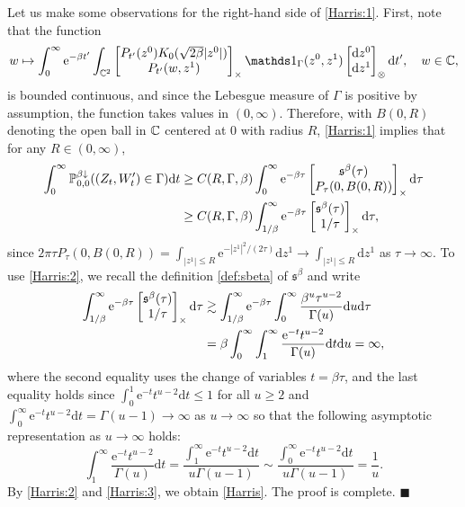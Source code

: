 \documentclass[12pt, twoside]{article}
\numberwithin{figure}{section}
\newcommand{\more}{\gtrsim}
\newcommand{\e}{{\mathrm e}}
\newcommand{\1}{\mathds 1}
\newcommand{\da}{{\downarrow}}
\renewcommand{\P}{{\mathbb P}}
\renewcommand{\d}{{\mathrm d}}
\newcommand{\2}{{\mathbf 1}}
\newcommand{\s}{{\mathfrak s}}
\renewenvironment{proof}[1][\proofname]{\noindent {\bfseries #1.}\;}{\hfill\ensuremath{\blacksquare}\\}
\newcommand{\cc}{{^\circ}}
\begin{document}
\begin{proof}[Proof of Theorem~\ref{thm:ht} (1$\cc$)]
Let us make some observations for the right-hand side of \eqref{Harris:1}. First, note that the function 
\[
w\mapsto \int_0^\infty \e^{-\beta t'}
\int_{\Bbb C^2}
\begin{bmatrix}
P_{t'}(z^0)K_0(\sqrt{2\beta}|z^0|)\\
P_{t'}(w,z^1)
\end{bmatrix}_\times\1_\Gamma(z^0,z^1)\begin{bmatrix}
\d z^0\\
\d z^1
\end{bmatrix}_{\otimes}\d t',\quad w\in \Bbb C,
\]
is bounded continuous, and since the Lebesgue measure of $\Gamma$ is positive by assumption, the function takes values in $(0,\infty)$.  Therefore, with $B(0,R)$ denoting the open ball in $\Bbb C$ centered at $0$ with radius $R$, \eqref{Harris:1} implies that for any $R\in (0,\infty)$, 
\begin{align} 
 \int_0^\infty \P^{\beta\da}_{0,0}((Z_t,W'_t)\in \Gamma)\d t
&\geq  C(R,\Gamma,\beta)
\int_0^\infty \e^{-\beta \tau}
\begin{bmatrix}
 \s^\beta(\tau)\\
P_{\tau}(0,B(0,R))
\end{bmatrix}_\times \d \tau\notag\\
&\geq C(R,\Gamma,\beta)
\int_{1/\beta}^\infty \e^{-\beta \tau}
\begin{bmatrix}
 \s^\beta(\tau)\\
1/\tau
\end{bmatrix}_\times \d \tau,\label{Harris:2}
\end{align}
since 
$2\pi \tau P_\tau(0,B(0,R))=\int_{|z^1|\leq R}\e^{-|z^1|^2/(2\tau)}\d z^1\to \int_{|z^1|\leq R}\d z^1$ as $\tau\to\infty$. To use \eqref{Harris:2}, we recall the definition \eqref{def:sbeta} of $\s^\beta$ and write
\begin{align}
\int_{1/\beta}^\infty \e^{-\beta \tau}
\begin{bmatrix}
 \s^\beta(\tau)\\
1/\tau
\end{bmatrix}_\times \d \tau&\more\int_{1/\beta}^\infty \e^{-\beta \tau}\int_0^\infty  \frac{\beta^u \tau^{u-2}}{\Gamma(u)}\d u\d \tau\notag\\
&=\beta\int_0^\infty \int_1^\infty \frac{ \e^{-t}t^{u-2}}{\Gamma(u)}\d t\d u=\infty,\label{Harris:3}
\end{align}
where the second equality uses the change of variables $t=\beta\tau$, and the last equality holds since $\int_0^1 \e^{-t}t^{u-2}\d t\leq 1$ for all $u\geq 2$ and $\int_0^\infty \e^{-t}t^{u-2}\d t=\Gamma(u-1)\to\infty$ as $u\to\infty$ so that the following asymptotic representation as $u\to\infty$ holds:
\[
\int_1^\infty\frac{ \e^{-t}t^{u-2}}{\Gamma(u)}\d t=\frac{\int_1^\infty \e^{-t}t^{u-2}\d t}{u\Gamma(u-1)}\sim \frac{\int_0^\infty \e^{-t}t^{u-2}\d t}{u\Gamma(u-1)}
=\frac{1}{u}.
\]
By \eqref{Harris:2} and \eqref{Harris:3}, we obtain \eqref{Harris}. The proof is complete. 
\end{proof}
\end{document}
